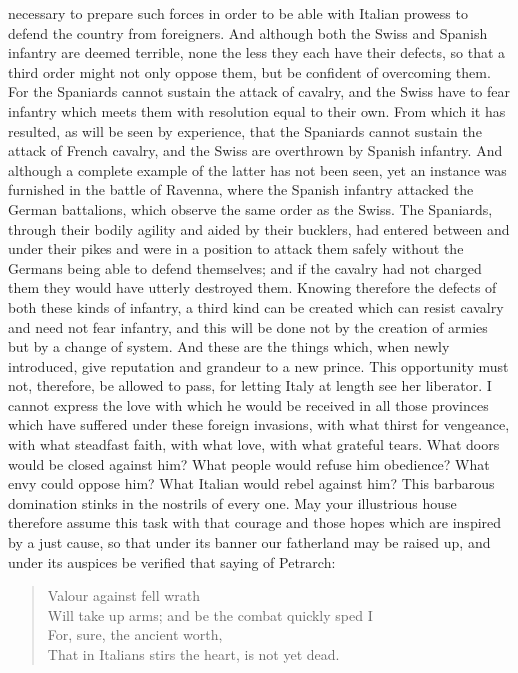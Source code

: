 \documentclass[12pt,letterpaper]{memoir}
\begin{document}
necessary to prepare such forces in order to be able with Italian
prowess to defend the country from foreigners. And although both the
Swiss and Spanish infantry are deemed terrible, none the less they
each have their defects, so that a third order might not only oppose
them, but be confident of overcoming them. For the Spaniards cannot
sustain the attack of cavalry, and the Swiss have to fear infantry
which meets them with resolution equal to their own. From which it has
resulted, as will be seen by experience, that the Spaniards cannot
sustain the attack of French cavalry, and the Swiss are overthrown
by Spanish infantry. And although a complete example of the latter
has not been seen, yet an instance was furnished in the battle of
Ravenna, where the Spanish infantry attacked the German battalions,
which observe the same order as the Swiss. The Spaniards, through their
bodily agility and aided by their bucklers, had entered between and
under their pikes and were in a position to attack them safely without
the Germans being able to defend themselves; and if the cavalry had not
charged them they would have utterly destroyed them. Knowing therefore
the defects of both these kinds of infantry, a third kind can be
created which can resist cavalry and need not fear infantry, and this
will be done not by the creation of armies but by a change of system.
And these are the things which, when newly introduced, give reputation
and grandeur to a new prince. This opportunity must not, therefore,
be allowed to pass, for letting Italy at length see her liberator. I
cannot express the love with which he would be received in all those
provinces which have suffered under these foreign invasions, with what
thirst for vengeance, with what steadfast faith, with what love, with
what grateful tears. What doors would be closed against him? What
people would refuse him obedience? What envy could oppose him? What
Italian would rebel against him? This barbarous domination stinks in
the nostrils of every one. May your illustrious house therefore assume
this task with that courage and those hopes which are inspired by a
just cause, so that under its banner our fatherland may be raised up,
and under its auspices be verified that saying of Petrarch:

\begin{quote}
    Valour against fell wrath\\
    Will take up arms; and be the combat quickly sped I\\
    For, sure, the ancient worth,\\
    That in Italians stirs the heart, is not yet dead.
\end{quote}
\end{document}
